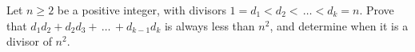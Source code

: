 Let $n\geq2$ be a positive integer, with divisors $1=d_1<d_2<\,\ldots<d_k=n$.  Prove that $d_1d_2+d_2d_3+\,\ldots\,+d_{k-1}d_k$ is always less than $n^2$,  and determine when it is a divisor of $n^2$.
